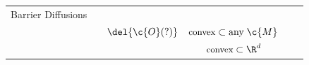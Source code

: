 \begin{table}
\begin{tabular}{lccccc}
		\midrule
		Barrier Diffusions                                                                                                                                                                                                                                        \\
		\scshape \textcite{fishman2023diffusion_hl}  & \xmark                                                                                        & \xmark \hspace{0.1em} \(\del{\c{O}(?)}\) & \(\text{\small convex}\;{\subset}\;\text{any}\;\c{M}\) & \cmark \\
		\scshape \textcite{liu2024mirror}            & \cmark                                                                                        & \cmark                                   & \(\text{\small convex}\;{\subset}\;\R^d\)              & \xmark \\

		\bottomrule
	\end{tabular}
\end{table}
